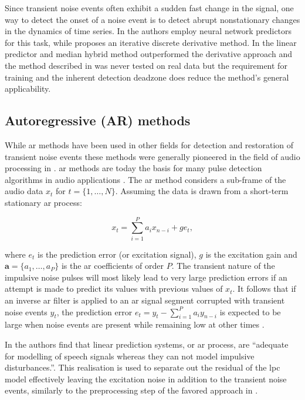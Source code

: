 Since transient noise events often exhibit a sudden fast change in the signal, one way to detect the onset of a noise event is to detect abrupt nonstationary changes in the dynamics of time series. In \cite{Fancourt2000} the authors employ neural network predictors for this task, while \cite{Kauppinen2002} proposes an iterative discrete derivative method. In \cite{Kauppinen2002} the linear predictor and median hybrid method outperformed the derivative approach and the method described in \cite{Fancourt2000} was never tested on real data but the requirement for training and the inherent detection deadzone does reduce the method's general applicability.

\subsection{Autoregressive (AR) methods}\label{sec:LitRevAR}
While \gls{ar} methods have been used in other fields for detection and restoration of transient noise events \cite{Arakawa1986} these methods were generally pioneered in the field of audio processing in \cite{Vaseghi1988thesis}\cite{Vaseghi1988}\cite{Vaseghi1990}. \gls{ar} methods are today the basis for many pulse detection algorithms in audio applications \cite{Karjalainen1997}\cite{Esquef2000}\cite{Haermae2000}\cite{Esquef2002}\cite{Kauppinen2002}\cite{Wolfe2005}\cite{Subramanya2007}. The \gls{ar} method considers a sub-frame of the audio data $x_t$ for $ t = \{ 1, \ldots, N \}$. Assuming the data is drawn from a short-term stationary \gls{ar} process:

\begin{equation}\label{eq:ARmodel}
x_t = \sum_{i=1}^P a_i x_{n-i} + ge_t,
\end{equation}

where $e_t$ is the prediction error (or excitation signal), $g$ is the excitation gain and $\mathbf{a} = \{a_1,\ldots,a_P\}$ is the \gls{ar} coefficients of order $P$. The transient nature of the impulsive noise pulses will most likely lead to very large prediction errors if an attempt is made to predict its values with previous values of $x_t$. It follows that if an inverse \gls{ar} filter is applied to an \gls{ar} signal segment corrupted with transient noise events $y_t$, the prediction error $e_t = y_t - \sum_{i=1}^P a_i y_{n-i}$ is expected to be large when noise events are present while remaining low at other times \cite{Godsill1998book}.

In \cite{Vaseghi1990} the authors find that linear prediction systems, or \gls{ar} process, are ``adequate for modelling of speech signals whereas they can not model impulsive disturbances.''. This realisation is used to separate out the residual of the \gls{lpc} model effectively leaving the excitation noise in addition to the transient noise events, similarly to the preprocessing step of the favored approach in \cite{Kauppinen2002}.


